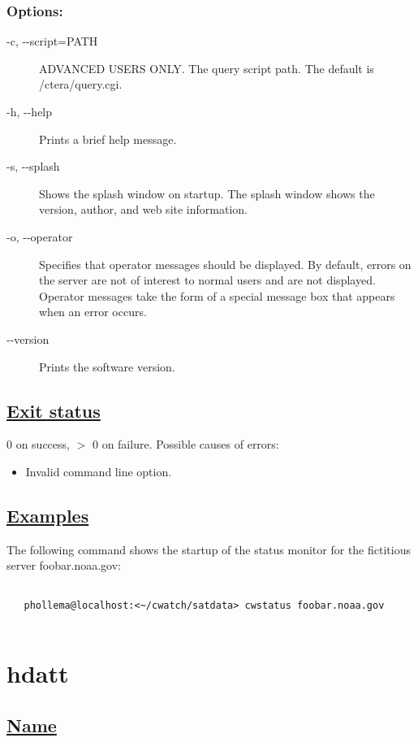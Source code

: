 \subsubsection*{Options:}
\begin{description}
\item[ -c, -{-}script=PATH ] ADVANCED USERS ONLY. The query script path. The default is /ctera/query.cgi. 
\item[ -h, -{-}help ] Prints a brief help message. 
\item[-s, -{-}splash]Shows the splash window on startup. The splash window shows the version, author, and web site information.
\item[ -o, -{-}operator ] Specifies that operator messages should be displayed. By default, errors on the server are not of interest to normal users and are not displayed. Operator messages take the form of a special message box that appears when an error occurs.
\item[-{-}version]Prints the software version.

\end{description}
\subsection*{\underline{Exit status}}


  0 on success, $>$ 0 on failure. Possible causes of errors: \begin{itemize}
\item  Invalid command line option. 

\end{itemize}

\subsection*{\underline{Examples}}


  The following command shows the startup of the status monitor for the fictitious server foobar.noaa.gov: \begin{verbatim}

   phollema@localhost:<~/cwatch/satdata> cwstatus foobar.noaa.gov
 
\end{verbatim}


\newpage
\section{hdatt} \hypertarget{hdatt}{}
\subsection*{\underline{Name}}


